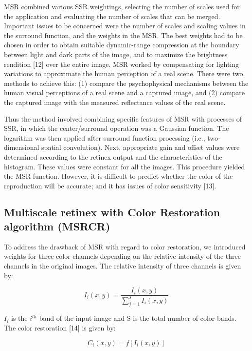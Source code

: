 MSR combined various SSR weightings, selecting the
number of scales used for the application and evaluating
the number of scales that can be merged. Important
issues to be concerned were the number of scales and
scaling values in the surround function, and the weights
in the MSR. The best weights had to be chosen in order
to obtain suitable dynamic-range compression at the
boundary between light and dark parts of the image, and
to maximize the brightness rendition [12] over the entire
image. MSR worked by compensating for lighting
variations to approximate the human perception of a real
scene. There were two methods to achieve this: (1)
compare the psychophysical mechanisms between the
human visual perceptions of a real scene and a captured
image, and (2) compare the captured image with the
measured reflectance values of the real scene.

Thus the method involved combining specific features of
MSR with processes of SSR, in which the
center/surround operation was a Gaussian function. The
logarithm was then applied after surround function
processing (i.e., two-dimensional spatial convolution).
Next, appropriate gain and offset values were determined according to the retinex output and the characteristics of
the histogram. These values were constant for all the
images. This procedure yielded the MSR function.
However, it is difficult to predict whether the color of the
reproduction will be accurate; and it has issues of color
sensitivity [13].



\subsection{Multiscale retinex with Color Restoration algorithm (MSRCR)}
To address the drawback of MSR with regard to color
restoration, we introduced weights for three color
channels depending on the relative intensity of the three
channels in the original images. The relative intensity of
three channels is given by:

\begin{equation}
	I_{i}(x,y)=\frac{I_{i}(x,y)}{\sum_{j=1}^{s}I_{i}(x,y)}
\end{equation}

$I_{i}$ is the $i^{th}$ band of the input image and S is the total
number of color bands. The color restoration [14] is
given by:

\begin{equation}
	C_{i}(x,y)=f[I_{i}(x,y)]
\end{equation}

